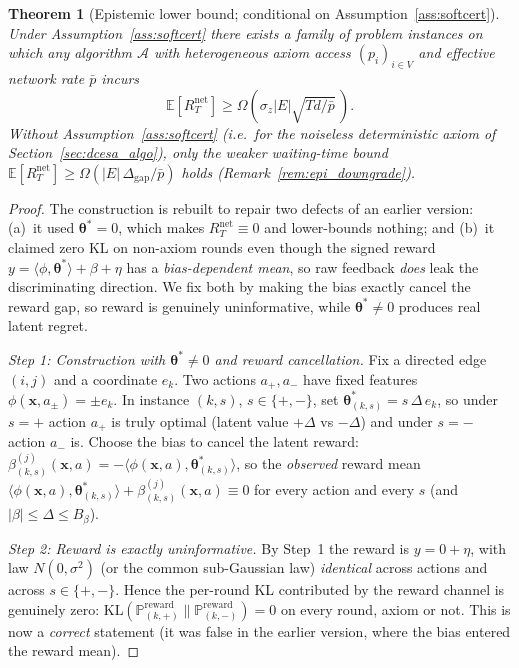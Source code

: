 \documentclass[11pt]{article}
\newtheorem{theorem}{Theorem}[section]
\begin{document}
\begin{theorem}[Epistemic lower bound; conditional on
Assumption~\ref{ass:softcert}]\label{thm:lower_epistemic}
Under Assumption~\ref{ass:softcert} there exists a family of problem
instances on which any algorithm $\mathcal{A}$ with heterogeneous axiom
access $(p_i)_{i\in V}$ and effective network rate $\bar{p}$ incurs
\[
\mathbb{E}[R_T^{\mathrm{net}}]\geq\Omega\!\left(\sigma_z|E|\sqrt{Td/\bar{p}}\,\right).
\]
Without Assumption~\ref{ass:softcert} (i.e.\ for the noiseless
deterministic axiom of Section~\ref{sec:dcesa_algo}), only the weaker
waiting-time bound $\mathbb{E}[R_T^{\mathrm{net}}]\geq\Omega(|E|\,\Delta_{\mathrm{gap}}/\bar p)$
holds (Remark~\ref{rem:epi_downgrade}).
\end{theorem}

\begin{proof}
The construction is rebuilt to repair two defects of an earlier
version: (a)~it used $\bm{\theta}^{\!*}=0$, which makes
$R_T^{\mathrm{net}}\equiv 0$ and lower-bounds nothing; and (b)~it
claimed zero KL on non-axiom rounds even though the signed reward
$y=\langle\phi,\bm{\theta}^{\!*}\rangle+\beta+\eta$ has a
\emph{bias-dependent mean}, so raw feedback \emph{does} leak the
discriminating direction.  We fix both by making the bias exactly
cancel the reward gap, so reward is genuinely uninformative, while
$\bm{\theta}^{\!*}\neq 0$ produces real latent regret.

\textit{Step 1: Construction with $\bm{\theta}^{\!*}\neq 0$ and reward
cancellation.}
Fix a directed edge $(i,j)$ and a coordinate $e_k$.  Two actions
$a_+,a_-$ have fixed features $\phi(\bm{x},a_\pm)=\pm e_k$.  In instance
$(k,s)$, $s\in\{+,-\}$, set
$\bm{\theta}^{\!*}_{(k,s)}=s\,\Delta\,e_k$, so under $s=+$ action $a_+$
is truly optimal (latent value $+\Delta$ vs $-\Delta$) and under $s=-$
action $a_-$ is.  Choose the bias to cancel the latent reward:
$\beta^{(j)}_{(k,s)}(\bm{x},a)=-\langle\phi(\bm{x},a),\bm{\theta}^{\!*}_{(k,s)}\rangle$,
so the \emph{observed} reward mean
$\langle\phi(\bm{x},a),\bm{\theta}^{\!*}_{(k,s)}\rangle
+\beta^{(j)}_{(k,s)}(\bm{x},a)\equiv 0$
for every action and every $s$ (and $|\beta|\leq\Delta\leq B_\beta$).

\textit{Step 2: Reward is exactly uninformative.}
By Step~1 the reward is $y=0+\eta$, with law $N(0,\sigma^2)$ (or the
common sub-Gaussian law) \emph{identical} across actions and across
$s\in\{+,-\}$.  Hence the per-round KL contributed by the reward
channel is genuinely zero:
$\mathrm{KL}(\mathbb{P}_{(k,+)}^{\mathrm{reward}}\|
\mathbb{P}_{(k,-)}^{\mathrm{reward}})=0$ on every round, axiom or not.
This is now a \emph{correct} statement (it was false in the earlier
version, where the bias entered the reward mean).


\end{proof}
\end{document}
